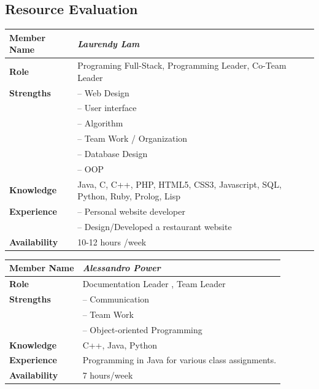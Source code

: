 \documentclass[12pt]{article}
\begin{document}
\subsection{Resource Evaluation}
\begin{center}
\begin{tabular}{ p{2.7cm} | p{9cm} }
\hline
\textbf{Member Name}	&	\textit{\textbf{Laurendy Lam}}	\\ \hline \hline
\textbf{Role}		&	Programing Full-Stack, Programming Leader, Co-Team Leader	\\ \hline
\textbf{Strengths}	&	-- Web Design	\\
			        &	-- User interface	\\
			        &	-- Algorithm	\\
					&	-- Team Work / Organization	\\
					&	-- Database Design	\\
					&	-- OOP	\\ \hline
\textbf{Knowledge}	&	Java, C, C++, PHP, HTML5, CSS3, Javascript, SQL, Python, Ruby, Prolog, Lisp	\\ \hline
\textbf{Experience}	&	-- Personal website developer	\\
					&	-- Design/Developed a restaurant website 	\\ \hline
\textbf{Availability}	&	10-12 hours /week	\\ \hline
\end{tabular}
\end{center}
%
\vspace{3mm}
%
\begin{center}
\begin{tabular}{ p{2.7cm} | p{9cm} }
\hline
\textbf{Member Name}	&	\textit{\textbf{Alessandro Power}}	\\ \hline \hline
\textbf{Role}		&	Documentation Leader , Team Leader	\\ \hline
\textbf{Strengths}	&	-- Communication	\\
					&	-- Team Work	\\
					&	-- Object-oriented Programming	\\ \hline
\textbf{Knowledge}	&	C++, Java, Python	\\ \hline
\textbf{Experience}	&	Programming in Java for various class assignments.	\\ \hline
\textbf{Availability}	&	7 hours/week	\\ \hline
\end{tabular}
\end{center}
%
\vspace{3mm}
\end{document}
